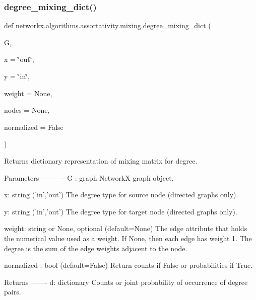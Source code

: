 \subsubsection{\texorpdfstring{degree\+\_\+mixing\+\_\+dict()}{degree\_mixing\_dict()}}
{\footnotesize\ttfamily def networkx.\+algorithms.\+assortativity.\+mixing.\+degree\+\_\+mixing\+\_\+dict (\begin{DoxyParamCaption}\item[{}]{G,  }\item[{}]{x = {\ttfamily \char`\"{}out\char`\"{}},  }\item[{}]{y = {\ttfamily \char`\"{}in\char`\"{}},  }\item[{}]{weight = {\ttfamily None},  }\item[{}]{nodes = {\ttfamily None},  }\item[{}]{normalized = {\ttfamily False} }\end{DoxyParamCaption})}

\begin{DoxyVerb}Returns dictionary representation of mixing matrix for degree.

Parameters
----------
G : graph
    NetworkX graph object.

x: string ('in','out')
   The degree type for source node (directed graphs only).

y: string ('in','out')
   The degree type for target node (directed graphs only).

weight: string or None, optional (default=None)
   The edge attribute that holds the numerical value used
   as a weight.  If None, then each edge has weight 1.
   The degree is the sum of the edge weights adjacent to the node.

normalized : bool (default=False)
    Return counts if False or probabilities if True.

Returns
-------
d: dictionary
   Counts or joint probability of occurrence of degree pairs.
\end{DoxyVerb}
 \mbox{\label{namespacenetworkx_1_1algorithms_1_1assortativity_1_1mixing_ab3348dec618ed0e112ba5df0282a2141}} 
